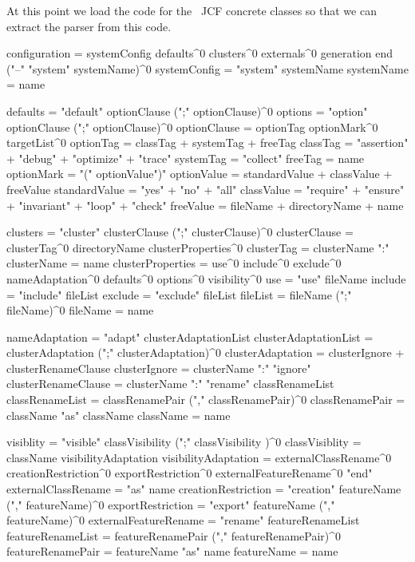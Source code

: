 
At this point we load the  code for the \joylol\ JCF 
concrete classes so that we can extract the parser from this code. 


\starttyping
configuration = systemConfig 
  defaults^0 
  clusters^0 
  externals^0 
  generation
  end ("--" "system" systemName)^0
systemConfig = "system" systemName
systemName   = name

defaults = "default" optionClause (";" optionClause)^0
options  = "option" optionClause (";" optionClause)^0
optionClause = optionTag optionMark^0 targetList^0
optionTag    = classTag + systemTag + freeTag
classTag     = "assertion" + "debug" + "optimize" + "trace"
systemTag    = "collect"
freeTag      = name
optionMark   = "(" optionValue")"
optionValue  = standardValue + classValue + freeValue
standardValue = "yes" + "no" + "all"
classValue    = "require" + "ensure" + "invariant" + "loop" + "check"
freeValue     = fileName + directoryName + name

clusters = "cluster" clusterClause (";" clusterClause)^0
clusterClause = clusterTag^0 directoryName clusterProperties^0
clusterTag    = clusterName ":"
clusterName   = name
clusterProperties = use^0
  include^0
  exclude^0
  nameAdaptation^0
  defaults^0
  options^0
  visibility^0
use = "use" fileName
include = "include" fileList
exclude = "exclude" fileList
fileList = fileName (";" fileName)^0
fileName = name

nameAdaptation = "adapt" clusterAdaptationList
clusterAdaptationList = clusterAdaptation (";" clusterAdaptation)^0
clusterAdaptation = clusterIgnore + clusterRenameClause
clusterIgnore = clusterName ":" "ignore"
clusterRenameClause = clusterName ":" "rename" classRenameList
classRenameList = classRenamePair ("," classRenamePair)^0
classRenamePair = className "as" className
className = name

visiblity = "visible" classVisibility (";" classVisibility )^0
classVisiblity = className visibilityAdaptation
visibilityAdaptation = externalClassRename^0
  creationRestriction^0
  exportRestriction^0
  externalFeatureRename^0
  "end"
externalClassRename = "as" name
creationRestriction = "creation" featureName ("," featureName)^0
exportRestriction = "export" featureName ("," featureName)^0
externalFeatureRename = "rename" featureRenameList
featureRenameList = featureRenamePair ("," featureRenamePair)^0
featureRenamePair = featureName "as" name
featureName = name

